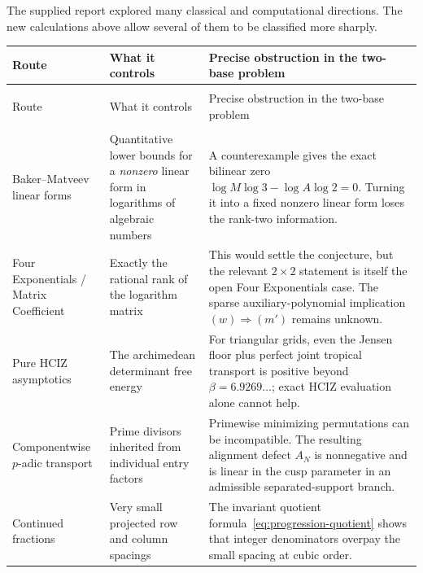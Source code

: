 \documentclass[11pt]{article}
\newcommand{\1}{\mathbf 1}
\theoremstyle{plain}
\theoremstyle{definition}
\theoremstyle{remark}
\begin{document}
The supplied report explored many classical and computational directions.
The new calculations above allow several of them to be classified more
sharply.

\begingroup
\small
\setlength{\tabcolsep}{4pt}
\renewcommand{\arraystretch}{1.06}
\begin{longtable}{@{}>{\raggedright\arraybackslash}p{}
>{\raggedright\arraybackslash}p{}
>{\raggedright\arraybackslash}p{}@{}}
\toprule
Route & What it controls & Precise obstruction in the two-base problem\\
\midrule
\endfirsthead
\multicolumn{3}{c}{Audit of proof routes (continued)}\\
\toprule
Route & What it controls & Precise obstruction in the two-base problem\\
\midrule
\endhead
\midrule
\multicolumn{3}{r}{continued on next page}\\
\endfoot
\bottomrule
\endlastfoot
Baker--Matveev linear forms
& Quantitative lower bounds for a \emph{nonzero} linear form in logarithms of
algebraic numbers
& A counterexample gives the exact bilinear zero
$\log M\log3-\log A\log2=0$.  Turning it into a fixed nonzero linear form
loses the rank-two information.\\

Four Exponentials / Matrix Coefficient
& Exactly the rational rank of the logarithm matrix
& This would settle the conjecture, but the relevant $2\times2$ statement is
itself the open Four Exponentials case.  The sparse auxiliary-polynomial
implication $(w)\Rightarrow(m')$ remains unknown.\\

Pure HCIZ asymptotics
& The archimedean determinant free energy
& For triangular grids, even the Jensen floor plus perfect joint tropical
transport is positive beyond $\beta=6.9269\ldots$; exact HCIZ evaluation alone
cannot help.\\

Componentwise $p$-adic transport
& Prime divisors inherited from individual entry factors
& Primewise minimizing permutations can be incompatible.  The resulting
alignment defect $A_N$ is nonnegative and is linear in the cusp parameter in
an admissible separated-support branch.\\

Continued fractions
& Very small projected row and column spacings
& The invariant quotient formula~\eqref{eq:progression-quotient} shows that
integer denominators overpay the small spacing at cubic order.\\


\end{longtable}
\end{document}
